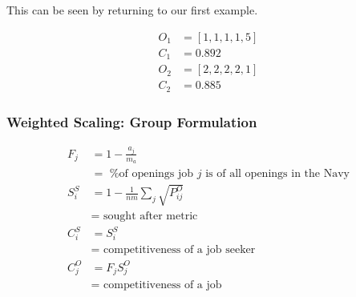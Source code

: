 This can be seen by returning to our first example.

\begin{align}
O_1 &= [1,1,1,1,5] \\
C_1 &= 0.892\\
O_2 &= [2,2,2,2,1] \\
C_2 &= 0.885
\end{align}

\subsubsection{Weighted Scaling: Group Formulation}

\begin{align*}
F_j &= 1 - \frac{a_j}{m_a} \\
&= \text{ \% of openings job $j$ is of all openings in the Navy} \\ 
S^S_i &= 1 - \frac{1}{nm} \sum_j \sqrt{P_{ij}^O} \\
&= \text{ sought after metric} \\
C_i^S &= S^S_i \\
&= \text{ competitiveness of a job seeker} \\
C_j^O &= F_j S^O_j \\
&= \text{ competitiveness of a job} \\
\end{align*}


